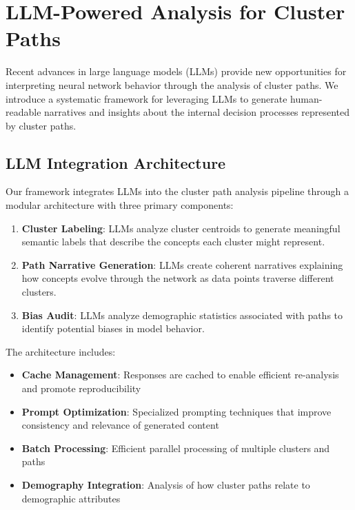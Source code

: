 \section{LLM-Powered Analysis for Cluster Paths}

Recent advances in large language models (LLMs) provide new opportunities for interpreting neural network behavior through the analysis of cluster paths. We introduce a systematic framework for leveraging LLMs to generate human-readable narratives and insights about the internal decision processes represented by cluster paths.

\subsection{LLM Integration Architecture}

Our framework integrates LLMs into the cluster path analysis pipeline through a modular architecture with three primary components:

\begin{enumerate}
    \item \textbf{Cluster Labeling}: LLMs analyze cluster centroids to generate meaningful semantic labels that describe the concepts each cluster might represent.
    \item \textbf{Path Narrative Generation}: LLMs create coherent narratives explaining how concepts evolve through the network as data points traverse different clusters.
    \item \textbf{Bias Audit}: LLMs analyze demographic statistics associated with paths to identify potential biases in model behavior.
\end{enumerate}

The architecture includes:

\begin{itemize}
    \item \textbf{Cache Management}: Responses are cached to enable efficient re-analysis and promote reproducibility
    \item \textbf{Prompt Optimization}: Specialized prompting techniques that improve consistency and relevance of generated content
    \item \textbf{Batch Processing}: Efficient parallel processing of multiple clusters and paths
    \item \textbf{Demography Integration}: Analysis of how cluster paths relate to demographic attributes
\end{itemize}

